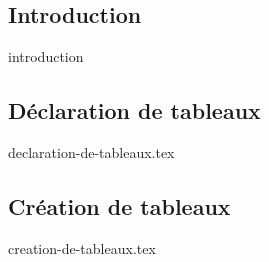 \subsection{Introduction}\label{subsec:introduction}
    {introduction}
\subsection{Déclaration de tableaux}\label{subsec:declaration-de-tableaux}
    {declaration-de-tableaux.tex}
\subsection{Création de tableaux}\label{subsec:creation-de-tableaux}
    {creation-de-tableaux.tex}